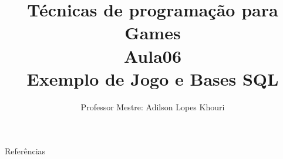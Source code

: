 \documentclass[compress, hyperref={pdfpagelayout=SinglePage}]{beamer}
\title[AED - Aula 06]{Técnicas de programação para Games \\ Aula06 \\ Exemplo de Jogo e Bases SQL}
\author{Professor Mestre: Adilson Lopes Khouri}
\begin{document}
	\begin{frame}
		\titlepage
	\end{frame}
	
	
	
	

	
	
	
			
	

	

	\begin{frame}{}
		\begin{block}{Referências}
			\nocite{*}
			
	    		
		\end{block}
	\end{frame}
\end{document}
